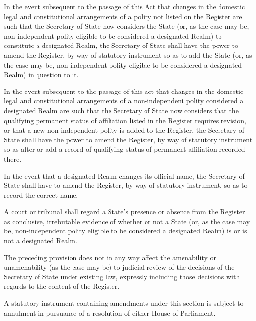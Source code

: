 \documentclass[private]{ukbill}
\begin{document}
\begin{numstat}
\item  	In the event subsequent to the passage of this Act that changes in the domestic legal and constitutional arrangements of a polity not listed on the Register are such that the Secretary of State now considers the State (or, as the case may be, non-independent polity eligible to be considered a designated Realm) to constitute a designated Realm, the Secretary of State shall have the power to amend the Register, by way of statutory instrument  so as to add the State (or, as the case may be, non-independent polity eligible to be considered a designated Realm) in question to it.

\item  	In the event subsequent to the passage of this act that changes in the domestic legal and constitutional arrangements of a non-independent polity considered a designated Realm are such that the Secretary of State now considers that the qualifying permanent status of affiliation listed in the Register requires revision, or that a new non-independent polity is added to the Register, the Secretary of State shall have the power to amend the Register, by way of statutory instrument  so as alter or add a record of qualifying status of permanent affiliation recorded there. 
\item In the event that a designated Realm changes its official name, the Secretary of State shall have to amend the Register, by way of statutory instrument, so as to record the correct name.
\item A court or tribunal shall regard a State's presence or absence from the Register as conclusive, irrebutable  evidence of whether or not a State (or, as the case may be, non-independent polity eligible to be considered a designated Realm) is or is not a designated Realm.
\begin{alphstat}
\item  The preceding provision does not in any way affect the amenability or unamenability (as the case may be) to judicial review of the decisions of the Secretary of State under existing law, expressly including those decisions with regards to the content of the Register.  
  \end{alphstat}
\item A statutory instrument containing amendments under this section is subject to annulment in pursuance of a resolution of either House of Parliament.
	 \end{numstat}
	 
	 
 
\end{document}
